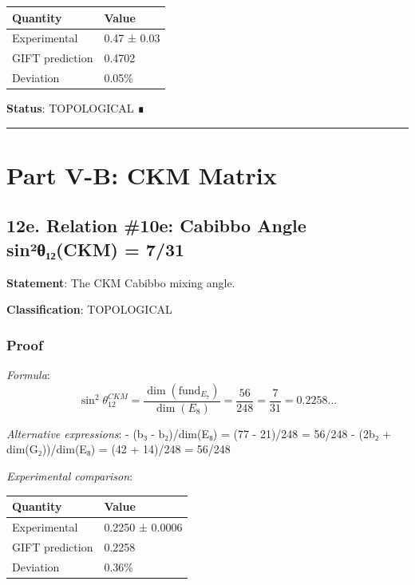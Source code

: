 \documentclass[11pt,a4paper]{article}
\begin{document}
{\def\LTcaptype{none} %
\begin{longtable}[]{@{}ll@{}}
\toprule\noalign{}
Quantity & Value \\
\midrule\noalign{}
\endhead
\bottomrule\noalign{}
\endlastfoot
Experimental & 0.47 ± 0.03 \\
GIFT prediction & 0.4702 \\
Deviation & 0.05\% \\
\end{longtable}
}

\textbf{Status}: TOPOLOGICAL ∎

\begin{center}\rule{0.5\linewidth}{0.5pt}\end{center}

\section{Part V-B: CKM Matrix}\label{part-v-b-ckm-matrix}

\subsection{12e. Relation \#10e: Cabibbo Angle sin²θ₁₂(CKM) = 7/31}\label{e.-relation-10e-cabibbo-angle-sinuxb2ux3b8ux2081ux2082ckm-731}

\textbf{Statement}: The CKM Cabibbo mixing angle.

\textbf{Classification}: TOPOLOGICAL

\subsubsection{Proof}\label{proof-12}

\emph{Formula}:
\[\sin^2\theta_{12}^{CKM} = \frac{\dim(\text{fund}_{E_7})}{\dim(E_8)} = \frac{56}{248} = \frac{7}{31} = 0.2258...\]

\emph{Alternative expressions}:
- (b₃ - b₂)/dim(E₈) = (77 - 21)/248 = 56/248
- (2b₂ + dim(G₂))/dim(E₈) = (42 + 14)/248 = 56/248

\emph{Experimental comparison}:

{\def\LTcaptype{none} %
\begin{longtable}[]{@{}ll@{}}
\toprule\noalign{}
Quantity & Value \\
\midrule\noalign{}
\endhead
\bottomrule\noalign{}
\endlastfoot
Experimental & 0.2250 ± 0.0006 \\
GIFT prediction & 0.2258 \\
Deviation & 0.36\% \\
\end{longtable}
}
\end{document}
